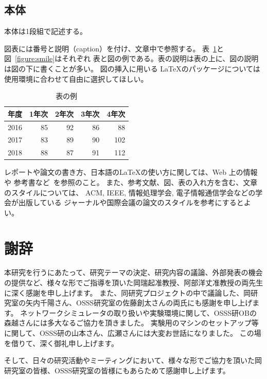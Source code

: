 \documentclass[a4paper,11pt]{jreport}
\begin{document}
\section{本体}

本体は1段組で記述する。

図表には番号と説明（caption）を付け、文章中で参照する。
表~\ref{table:scores}と図~\ref{figure:smile}はそれぞれ
表と図の例である。表の説明は表の上に、図の説明は図の下に書くことが多い。
図の挿入に用いる \LaTeX のパッケージについては使用環境に合わせて自由に選択してほしい。

\begin{table}[hbt]
\caption{表の例}
\label{table:scores}
\begin{center}
\begin{tabular}{|c|r|r|r|r|}
\hline
年度 & 1年次 & 2年次 & 3年次 & 4年次 \\
\hline
2016 & 85 & 92 & 86 &  88 \\
2017 & 83 & 89 & 90 & 102 \\
2018 & 88 & 87 & 91 & 112 \\
\hline
\end{tabular}
\end{center}
\end{table}
\medskip

レポートや論文の書き方、日本語の\LaTeX の使い方に関しては、Web 上の情報や
参考書など~\cite{Bibunsho,ScienceResearchWriting}を参照のこと。
また、参考文献、図、表の入れ方を含む、文章のスタイルについては、
ACM, IEEE, 情報処理学会, 電子情報通信学会などの学会が出版している
ジャーナルや国際会議の論文のスタイルを参考にするとよい。

\chapter*{謝辞}

本研究を行うにあたって、研究テーマの決定、研究内容の議論、外部発表の機会の提供など、様々な形でご指導を頂いた岡瑞起准教授、阿部洋丈准教授の両先生に深く感謝を申し上げます。
また、同研究プロジェクトの中で議論した、岡研究室の矢内千陽さん、OSSS研究室の佐藤創太さんの両氏にも感謝を申し上げます。
ネットワークシミュレータの取り扱いや実験環境に関して、OSSS研OBの森越さんには多大なるご協力を頂きました。
実験用のマシンのセットアップ等に関して、OSSS研の山本さん、広瀬さんには大変お世話になりました。
この場を借りて、深く御礼申し上げます。

そして、日々の研究活動やミーティングにおいて、様々な形でご協力を頂いた岡研究室の皆様、OSSS研究室の皆様にもあらためて感謝申し上げます。
\end{document}
